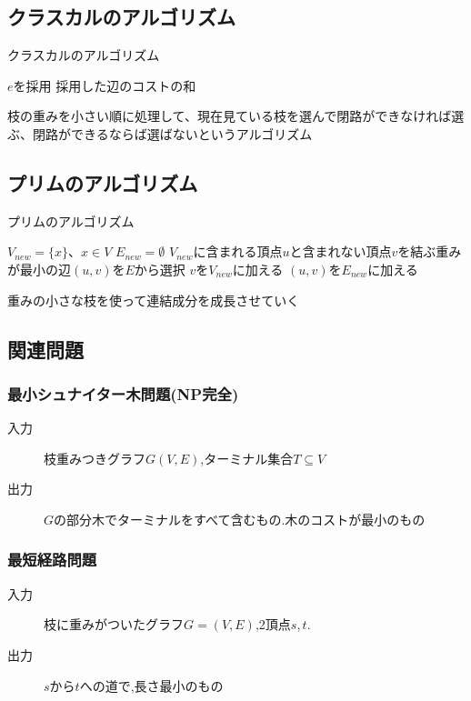 \documentclass[a4j,10.5pt]{jarticle}
\theoremstyle{break}
\begin{document}
\subsection{クラスカルのアルゴリズム}

\begin{algorithm}
\caption{クラスカルのアルゴリズム}
\begin{algorithmic}[1]
\STATE $e$を採用
\ENDIF
\ENDFOR
\RETURN 採用した辺のコストの和
\end{algorithmic}
\end{algorithm}

枝の重みを小さい順に処理して、現在見ている枝を選んで閉路ができなければ選ぶ、閉路ができるならば選ばないというアルゴリズム

\subsection{プリムのアルゴリズム}
\begin{algorithm}
\caption{プリムのアルゴリズム}
\begin{algorithmic}[1]
\STATE $V_{new} = \{x\}、x \in V$
\STATE $E_{new} = \emptyset$
\STATE $V_{new}$に含まれる頂点$u$と含まれない頂点$v$を結ぶ重みが最小の辺$(u,v)$を$E$から選択
\STATE $v$を$V_{new}$に加える
\STATE $(u,v)$を$E_{new}$に加える
\ENDWHILE
\end{algorithmic}
\end{algorithm}

重みの小さな枝を使って連結成分を成長させていく

\subsection{関連問題}
\subsubsection*{最小シュナイター木問題(NP完全)}
\begin{description}
\item[入力] 枝重みつきグラフ$G(V,E)$,ターミナル集合$T \subseteq V$
\item[出力] $G$の部分木でターミナルをすべて含むもの.木のコストが最小のもの
\end{description}
\subsubsection*{最短経路問題}
\begin{description}
\item[入力] 枝に重みがついたグラフ$G=(V,E)$,2頂点$s,t$.
\item[出力] $s$から$t$への道で,長さ最小のもの
\end{description}
\end{document}
